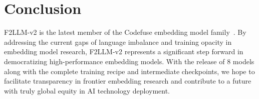 \section{Conclusion}

F2LLM-v2 is the latest member of the Codefuse embedding model family~\citep{2024D2LLM,2025f2llm,2025C2LLM}. By addressing the current gaps of language imbalance and training opacity in embedding model research, F2LLM-v2 represents a significant step forward in democratizing high-performance embedding models. With the release of 8 models along with the complete training recipe and intermediate checkpoints, we hope to facilitate transparency in frontier embedding research and contribute to a future with truly global equity in AI technology deployment.
